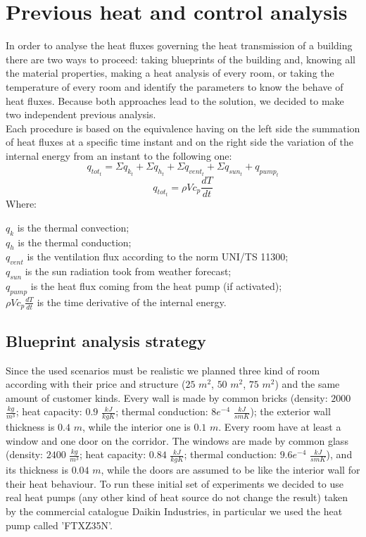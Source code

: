 \section{Previous heat and control analysis}
In order to analyse the heat fluxes governing the heat transmission of a building there are two ways to proceed: taking blueprints of the building and, knowing all the material properties, making a heat analysis of every room, or taking the temperature of every room and identify the parameters to know the behave of heat fluxes. Because both approaches lead to the solution, we decided to make two independent previous analysis. \\
Each procedure is based on the equivalence having on the left side the summation of heat fluxes at a specific time instant and on the right side the variation of the internal energy from an instant to the following one:
$$q_{tot_{t}} = \Sigma q_{k_{t}} + \Sigma q_{h_{t}} + \Sigma q_{vent_{t}} + \Sigma q_{sun_{t}} + q_{pump_{t}}$$
$$q_{tot_{t}} = \rho V c_{p} \frac{d T}{d t}$$
Where:

$q_{k}$ is the thermal convection; \\
$q_{h}$ is the thermal conduction; \\
$q_{vent}$ is the ventilation flux according to the norm UNI/TS 11300; \\
$q_{sun}$ is the sun radiation took from weather forecast; \\
$q_{pump}$ is the heat flux coming from the heat pump (if activated); \\
$\rho V c_{p} \frac{d T}{d t}$ is the time derivative of the internal energy.

\subsection{Blueprint analysis strategy}
Since the used scenarios must be realistic we planned three kind of room according with their price and structure ($25$ $m^2$, $50$ $m^2$, $75$ $m^2$) and the same amount of customer kinds.
Every wall is made by common bricks (density: $2000$ $\frac{kg}{m^3}$; heat capacity: $0.9$ $\frac{kJ}{kg K}$; thermal conduction: $8 e^{-4}$ $\frac{kJ}{s m K}$); the exterior wall thickness is $0.4$ $m$, while the interior one is $0.1$ $m$. Every room have at least a window and one door on the corridor. The windows are made by common glass (density: $2400$ $\frac{kg}{m^3}$; heat capacity: $0.84$ $\frac{kJ}{kg K}$; thermal conduction: $9.6 e^{-4}$ $\frac{kJ}{s m K}$), and its thickness is $0.04$ $m$, while the doors are assumed to be like the interior wall for their heat behaviour. To run these initial set of experiments we decided to use real heat pumps (any other kind of heat source do not change the result) taken by the commercial catalogue Daikin Industries, in particular we used the heat pump called 'FTXZ35N'.

